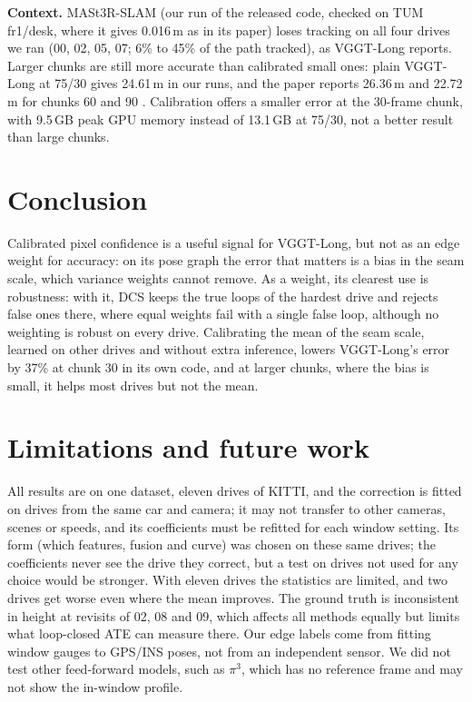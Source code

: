 \documentclass[conference]{IEEEtran}
\begin{document}
\textbf{Context.} MASt3R-SLAM \cite{mast3rslam} (our run of the released code, checked on TUM fr1/desk, where it gives
0.016\,m as in its paper) loses tracking on all four drives we ran (00, 02, 05, 07; 6\% to 45\% of the path tracked), as
VGGT-Long reports. Larger chunks are still more accurate than calibrated small ones: plain VGGT-Long at 75/30 gives
24.61\,m in our runs, and the paper reports 26.36\,m and 22.72\,m for chunks 60 and 90 \cite{vggtlong}. Calibration
offers a smaller error at the 30-frame chunk, with 9.5\,GB peak GPU memory instead of 13.1\,GB at 75/30, not a better
result than large chunks.

\section{Conclusion}

Calibrated pixel confidence is a useful signal for VGGT-Long, but not as an edge weight for accuracy: on its pose graph
the error that matters is a bias in the seam scale, which variance weights cannot remove. As a weight, its clearest
use is robustness: with it, DCS keeps the true loops of the hardest drive and rejects false ones there, where equal
weights fail with a single false loop, although no weighting is robust on every drive. Calibrating the mean of the
seam scale, learned on other drives and without extra inference, lowers VGGT-Long's error by 37\% at chunk 30 in its
own code, and at larger chunks, where the bias is small, it helps most drives but not the mean.

\section{Limitations and future work}

All results are on one dataset, eleven drives of KITTI, and the correction is fitted on drives from the same car and
camera; it may not transfer to other cameras, scenes or speeds, and its coefficients must be refitted for each window
setting. Its form (which features, fusion and curve) was chosen on these same drives; the coefficients never see the
drive they correct, but a test on drives not used for any choice would be stronger. With eleven drives the statistics are limited, and two drives get worse even where
the mean improves. The ground truth is inconsistent in height at revisits of 02, 08 and 09, which affects all methods
equally but limits what loop-closed ATE can measure there. Our edge labels come from fitting window gauges to GPS/INS
poses, not from an independent sensor. We did not test other feed-forward models, such as $\pi^3$, which has no
reference frame and may not show the in-window profile.
\end{document}
